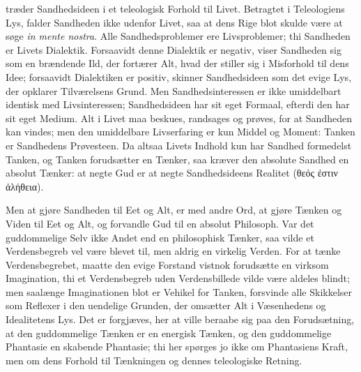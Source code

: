 \documentclass[12pt]{book}
\newcommand{\opage}[1]{\marginnote{\footnotesize\textit{[#1]}}}
\begin{document}
træder Sandhedsideen i et teleologisk Forhold til Livet. Betragtet i Teleologiens Lys,
falder Sandheden ikke udenfor Livet, saa at dens Rige blot skulde være at søge
\textit{in mente nostra}. Alle Sandhedsproblemer ere Livsproblemer; thi Sandheden er
Livets Dialektik. Forsaavidt denne Dialektik er negativ, viser Sandheden sig som en
brændende Ild, der fortærer Alt, hvad der stiller sig i Misforhold til dens Idee;
forsaavidt Dialektiken er positiv, skinner Sandhedsideen som det evige Lys, der
opklarer Tilværelsens Grund. Men Sandhedsinteressen er ikke umiddelbart identisk med
Livsinteressen; Sandhedsideen har sit eget Formaal, efterdi den har sit eget Medium.
Alt i Livet maa beskues, randsages og prøves, for at Sandheden kan vindes; men den
umiddelbare Livserfaring er kun Middel og Moment: Tanken er Sandhedens Prøvesteen. Da
\opage{252} %
altsaa Livets Indhold kun har Sandhed formedelst Tanken, og Tanken forudsætter en
Tænker, saa kræver den absolute Sandhed en absolut Tænker: at negte Gud er at negte
Sandhedsideens Realitet (θεός ἐστιν ἀλήθεια).

Men at gjøre Sandheden til Eet og Alt, er med andre Ord, at gjøre Tænken og Viden til
Eet og Alt, og forvandle Gud til en absolut Philosoph. Var det guddommelige Selv ikke
Andet end en philosophisk Tænker, saa vilde et Verdensbegreb vel være blevet til, men
aldrig en virkelig Verden. For at tænke Verdensbegrebet, maatte den evige Forstand
vistnok forudsætte en virksom Imagination, thi et Verdensbegreb uden Verdensbillede
vilde være aldeles blindt; men saalænge Imaginationen blot er Vehikel for Tanken,
forsvinde alle Skikkelser som Reflexer i den uendelige Grunden, der omsætter Alt i
Væsenhedens og Idealitetens Lys. Det er forgjæves, her at ville beraabe sig paa den
Forudsætning, at den guddommelige Tænken er en energisk Tænken, og den guddommelige
Phantasie en skabende Phantasie; thi her spørges jo ikke om Phantasiens Kraft, men om
dens Forhold til Tænkningen og dennes teleologiske Retning.
\end{document}
